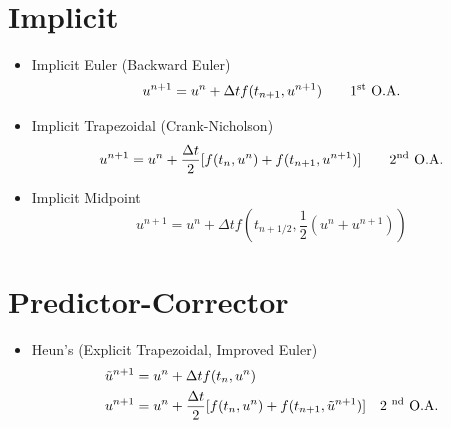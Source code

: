 \documentclass[oneside,a4paper,11pt]{report}
\begin{document}
\section{Implicit}
\begin{itemize}

\item Implicit Euler (Backward Euler)
\begin{equation}
u^{n+1} = u^n + \Delta t f(t_{n+1}, u^{n+1}) \qquad \text{1\textsuperscript{st} O.A.}
\end{equation}

\item Implicit Trapezoidal (Crank-Nicholson)
\begin{equation}
u^{n+1} = u^n + \frac{\Delta t}{2} [ f(t_n, u^n) + f(t_{n+1}, u^{n+1}) ] \qquad \text{2\textsuperscript{nd} O.A.}
\end{equation}

\item Implicit Midpoint
\begin{equation}
    u^{n+1} = u^n + \Delta t f\left (t_{n+1/2}, \frac{1}{2} \left (u^n + u^{n+1} \right ) \right )
\end{equation}

\end{itemize}

\section{Predictor-Corrector}
\begin{itemize}

\item Heun's (Explicit Trapezoidal, Improved Euler)
\begin{align}
\tilde{u}^{n+1} &= u^n + \Delta t f(t_n, u^n) \nonumber \\
u^{n+1}   &= u^n + \frac{\Delta t}{2} [ f(t_n, u^n) + f(t_{n+1}, \tilde{u}^{n+1}) ] \quad \text{2 \textsuperscript{nd} O.A.}
\end{align}

\end{itemize}
\end{document}
